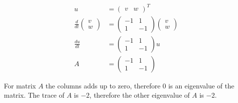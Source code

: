 \documentclass[main.tex]{subfiles}
\begin{document}
\begin{enumerate}
    $$
    \begin{aligned}
    u&=\left(\begin{array}{ll}
    v & w
    \end{array}\right)^{T}\\
    \frac{d}{d t}\left(\begin{array}{l}
    v \\
    w
    \end{array}\right)&=\left(\begin{array}{cc}
    -1 & 1 \\
    1 & -1
    \end{array}\right)\left(\begin{array}{l}
    v \\
    w
    \end{array}\right)\\
    \frac{d u}{d t}&=\left(\begin{array}{cc}
    -1 & 1 \\
    1 & -1
    \end{array}\right) u\\
    A&=\left(\begin{array}{cc}
    -1 & 1 \\
    1 & -1
    \end{array}\right)
    \end{aligned}
    $$

    For matrix $A$ the columns adds up to zero, therefore 0 is an eigenvalue of the matrix. The trace of $A$ is $-2$, therefore the other eigenvalue of $A$ is $-2$.


\end{enumerate}
\end{document}
